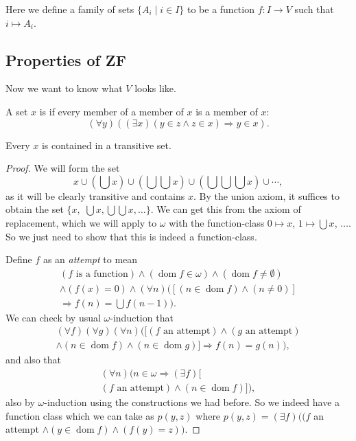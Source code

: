 \documentclass[a4paper, 10pt, twocolumn]{amsart}
\newcommand{\dom}{\operatorname{dom}}
\begin{document}
Here we define a family of sets $\{A_i \mid i \in I\}$ to be a function $f: I \rightarrow V$ such that $i \mapsto A_i$.

\subsection{Properties of ZF}
Now we want to know what $V$ looks like.

\begin{definition}
  A set $x$ is  if every member of a member of $x$ is a member of $x$:
  $$
  (\forall y)((\exists x)(y \in z \land z \in x) \Rightarrow y \in x).
  $$
\end{definition}

\begin{lemma}
  Every $x$ is contained in a transitive set.
\end{lemma}
\begin{proof}
  We will form the set
  $$
  x \cup \left(\bigcup x\right)\cup \left(\bigcup \bigcup x\right)\cup \left(\bigcup\bigcup\bigcup x\right)\cup \cdots,
  $$
  as it will be clearly transitive and contains $x$. By the union axiom, it suffices to obtain the set $\{x,$ $\bigcup x, \bigcup \bigcup x, \dots\}$. We can get this from the axiom of replacement, which we will apply to $\omega$ with the function-class $0 \mapsto x$, $1 \mapsto \bigcup x$, $\dots$. So we just need to show that this is indeed a function-class.

  Define $f$ as an \emph{attempt} to mean
  \begin{align*}
    (f \text{ is a function}) \land (\dom f \in \omega) \land (\dom f \neq \emptyset) \\
    \land  (f(x) = 0) \land (\forall n)([(n \in \dom f) \land (n \neq 0)] \\
    \Rightarrow f(n) = \bigcup f(n - 1)).
  \end{align*}
  We can check by usual $\omega$-induction that
  \begin{align*}
    (\forall f)(\forall g)(\forall n)([(f \text{ an attempt}) \land (g \text{ an attempt}) \\ 
    \land (n \in \dom f) \land (n \in \dom g)] \Rightarrow f(n) = g(n)),
  \end{align*}
  and also that
  \begin{align*}
    (\forall n)(n \in \omega \Rightarrow (\exists f)[\\
    (f \text{ an attempt}) \land (n \in \dom f)]),
  \end{align*}
  also by $\omega$-induction using the constructions we had before. So we indeed have a function class which we can take as $p(y, z)$ where
  $
p(y, z) = (\exists f)((f$ an attempt $\land (y \in \dom f) \land (f(y) = z)).
  $
\end{proof}
\end{document}

